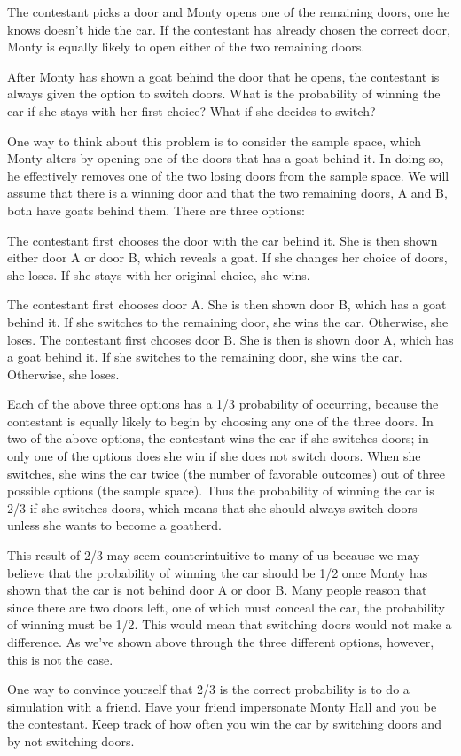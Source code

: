 \documentclass[12pt,a4paper]{article}
\begin{document}
The contestant picks a door and Monty opens one of the remaining doors, one he knows doesn't hide the car. If the contestant has already chosen the correct door, Monty is equally likely to open either of the two remaining doors.

After Monty has shown a goat behind the door that he opens, the contestant is always given the option to switch doors. What is the probability of winning the car if she stays with her first choice? What if she decides to switch?



One way to think about this problem is to consider the sample space, which Monty alters by opening one of the doors that has a goat behind it. In doing so, he effectively removes one of the two losing doors from the sample space.
We will assume that there is a winning door and that the two remaining doors, A and B, both have goats behind them. There are three options:

The contestant first chooses the door with the car behind it. She is then shown either door A or door B, which reveals a goat. If she changes her choice of doors, she loses. If she stays with her original choice, she wins.

The contestant first chooses door A. She is then shown door B, which has a goat behind it. If she switches to the remaining door, she wins the car. Otherwise, she loses.
The contestant first chooses door B. She is then is shown door A, which has a goat behind it. If she switches to the remaining door, she wins the car. Otherwise, she loses.

Each of the above three options has a 1/3 probability of occurring, because the contestant is equally likely to begin by choosing any one of the three doors. In two of the above options, the contestant wins the car if she switches doors; in only one of the options does she win if she does not switch doors. When she switches, she wins the car twice (the number of favorable outcomes) out of three possible options (the sample space). Thus the probability of winning the car is 2/3 if she switches doors, which means that she should always switch doors - unless she wants to become a goatherd.

This result of 2/3 may seem counterintuitive to many of us because we may believe that the probability of winning the car should be 1/2 once Monty has shown that the car is not behind door A or door B. Many people reason that since there are two doors left, one of which must conceal the car, the probability of winning must be 1/2. This would mean that switching doors would not make a difference. As we've shown above through the three different options, however, this is not the case.

One way to convince yourself that 2/3 is the correct probability is to do a simulation with a friend. Have your friend impersonate Monty Hall and you be the contestant. Keep track of how often you win the car by switching doors and by not switching doors.
\end{document}
